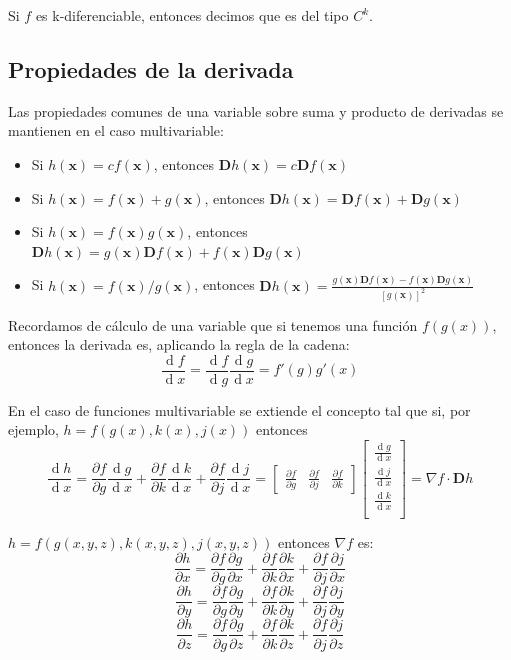 \documentclass[a4paper]{article}
\renewcommand{\d}[1]{\ensuremath{\operatorname{d}\!{#1}}}
\begin{document}
Si $f$ es k-diferenciable, entonces decimos que es del tipo $C^k$.


\subsection{Propiedades de la derivada}
Las propiedades comunes de una variable sobre suma y producto de derivadas se mantienen en el caso multivariable:
\begin{itemize}
	\item Si $h(\textbf{x}) = cf(\textbf{x})$, entonces $\textbf{D}h(\textbf{x}) = c\textbf{D}f(\textbf{x})$
	\item Si $h(\textbf{x}) = f(\textbf{x})+ g(\textbf{x})$, entonces $\textbf{D}h(\textbf{x}) = \textbf{D}f(\textbf{x})+\textbf{D}g(\textbf{x})$
	\item Si $h(\textbf{x}) = f(\textbf{x})g(\textbf{x})$, entonces $\textbf{D}h(\textbf{x}) = g(\textbf{x})\textbf{D}f(\textbf{x}) + f(\textbf{x})\textbf{D}g(\textbf{x})$
	\item Si $h(\textbf{x}) = f(\textbf{x})/g(\textbf{x})$, entonces $\textbf{D}h(\textbf{x}) = \frac{g(\textbf{x})\textbf{D}f(\textbf{x})-f(\textbf{x})\textbf{D}g(\textbf{x})}{[g(\textbf{x})]^2}$
\end{itemize}
Recordamos de cálculo de una variable que si tenemos una función $f(g(x))$, entonces la derivada es, aplicando la regla de la cadena: 
\[ \frac{\d f}{\d x} = \frac{\d f}{\d g}\frac{\d g}{\d x} = f'(g)g'(x) \]

En el caso de funciones multivariable se extiende el concepto tal que si, por ejemplo, $h = f(g(x),k(x),j(x))$ entonces 
\[\frac{\d h}{\d x} = \frac{\partial f}{\partial g}\frac{\d g}{\d x} + \frac{\partial f}{\partial k}\frac{\d k}{\d x} + \frac{\partial f}{\partial j}\frac{\d j}{\d x} = \left[\begin{matrix}
\frac{\partial f}{\partial g} & \frac{\partial f}{\partial j} & \frac{\partial f}{\partial k}
\end{matrix}\right]\left[\begin{matrix}
\frac{\d g}{\d x}\\ \frac{\d j}{\d x}\\ \frac{\d k}{\d x}\\
\end{matrix}\right] = \nabla f\cdot \textbf{D}h\]

$h = f(g(x,y,z),k(x,y,z),j(x,y,z))$ entonces $\nabla f$ es:
\[  \frac{\partial h}{\partial x} = \frac{\partial f}{\partial g}\frac{\partial g}{\partial x} + \frac{\partial f}{\partial k}\frac{\partial k}{\partial x} + \frac{\partial f}{\partial j}\frac{\partial j}{\partial x}\]
\[  \frac{\partial h}{\partial y} = \frac{\partial f}{\partial g}\frac{\partial g}{\partial y} + \frac{\partial f}{\partial k}\frac{\partial k}{\partial y} + \frac{\partial f}{\partial j}\frac{\partial j}{\partial y}\]
\[  \frac{\partial h}{\partial z} = \frac{\partial f}{\partial g}\frac{\partial g}{\partial z} + \frac{\partial f}{\partial k}\frac{\partial k}{\partial z} + \frac{\partial f}{\partial j}\frac{\partial j}{\partial z}\]
\end{document}
